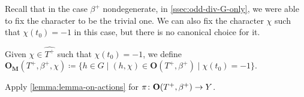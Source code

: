Recall that in the case $\beta^+$ nondegenerate, in \cref{ssec:odd-div-G-only}, we were able to fix the character to be the trivial one. 
We can also fix the character $\chi$ such that $\chi(t_0) = -1$ in this case, but there is no canonical choice for it. 

\begin{defi}
    Given $\chi \in \widehat{T^+}$ such that $\chi(t_0) = -1$, we define $\mathbf{O_M}(T^+, \beta^+, \chi) \coloneqq \{ h\in G \mid (h, \chi)\in \mathbf{O}(T^+, \beta^+) \mid \chi(t_0) = -1 \}$.
\end{defi}

\begin{cor}\label{cor:iso-odd-M-simplified}
    Apply \cref{lemma:lemma-on-actions} for $\pi\colon \mathbf{O}(T^+, \beta^+) \to Y$.
\end{cor}











